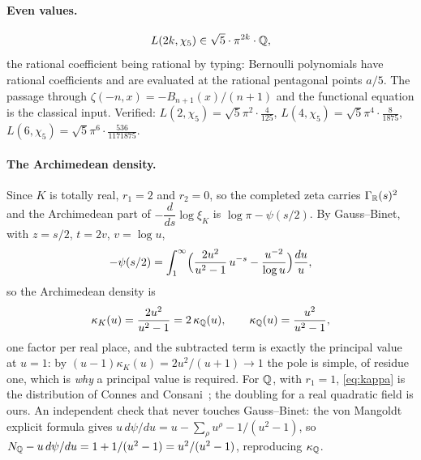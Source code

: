 \paragraph{Even values.}
\begin{equation}\label{eq:even-L}
  L(2k,\chi_5)\in\sqrt5\cdot\pi^{2k}\cdot\mathbb{Q} ,
\end{equation}
the rational coefficient being rational by typing: Bernoulli polynomials have rational
coefficients and are evaluated at the rational pentagonal points $a/5$. The passage through
$\zeta(-n,x)=-B_{n+1}(x)/(n+1)$ and the functional equation is the classical input. Verified:
$L(2,\chi_5)=\sqrt5\pi^{2}\cdot\tfrac{4}{125}$, $L(4,\chi_5)=\sqrt5\pi^{4}\cdot\tfrac{8}{1875}$,
$L(6,\chi_5)=\sqrt5\pi^{6}\cdot\tfrac{536}{1171875}$.



\paragraph{The Archimedean density.}
Since $K$ is totally real, $r_1=2$ and $r_2=0$, so the completed zeta carries $\Gamma_{\mathbb{R}}(s)^{2}$
and the Archimedean part of $-\dfrac{d}{ds}\log\xi_K$ is $\log\pi-\psi(s/2)$. By Gauss--Binet,
with $z=s/2$, $t=2v$, $v=\log u$,
\begin{equation}\label{eq:kappa-derivation}
  -\psi(s/2)=\int_1^{\infty}\Bigl(\frac{2u^{2}}{u^{2}-1}\,u^{-s}-\frac{u^{-2}}{\log u}\Bigr)
  \frac{du}{u},
\end{equation}
so the Archimedean density is
\begin{equation}\label{eq:kappa}
  \kappa_K(u)=\frac{2u^{2}}{u^{2}-1}=2\,\kappa_{\mathbb{Q}}(u),
  \qquad \kappa_{\mathbb{Q}}(u)=\frac{u^{2}}{u^{2}-1},
\end{equation}
one factor per real place, and the subtracted term is exactly the principal value at $u=1$: by
$(u-1)\kappa_K(u)=2u^{2}/(u+1)\to1$ the pole is simple, of residue one, which is \emph{why} a
principal value is required. For $\mathbb{Q}$, with $r_1=1$, \eqref{eq:kappa} is the distribution of
Connes and Consani~\cite{ConnesConsaniSite}; the doubling for a real quadratic field is ours.
An independent check that never touches Gauss--Binet: the von Mangoldt explicit formula gives
$u\,d\psi/du=u-\sum_\rho u^{\rho}-1/(u^{2}-1)$, so
$N_{\mathbb{Q}}-u\,d\psi/du=1+1/(u^{2}-1)=u^{2}/(u^{2}-1)$, reproducing $\kappa_{\mathbb{Q}}$.


